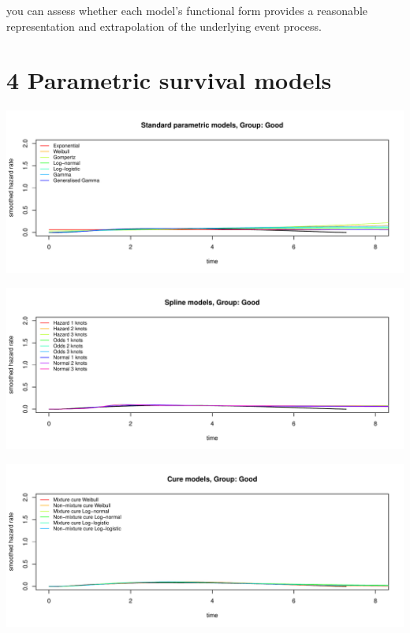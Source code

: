 \documentclass[
]{article}
\begin{document}
you can assess whether each model's functional form provides a
reasonable representation and extrapolation of the underlying event
process.

\clearpage

\section{4 Parametric survival models}\label{parametric-survival-models}

\begin{flushleft}\includegraphics[height=0.29\textheight]{BC_OS_output/Images/Figure_plot_haz_pred-1} \end{flushleft}

\begin{flushleft}\includegraphics[height=0.29\textheight]{BC_OS_output/Images/Figure_plot_haz_pred-2} \end{flushleft}

\begin{flushleft}\includegraphics[height=0.29\textheight]{BC_OS_output/Images/Figure_plot_haz_pred-3} \end{flushleft}
\end{document}
